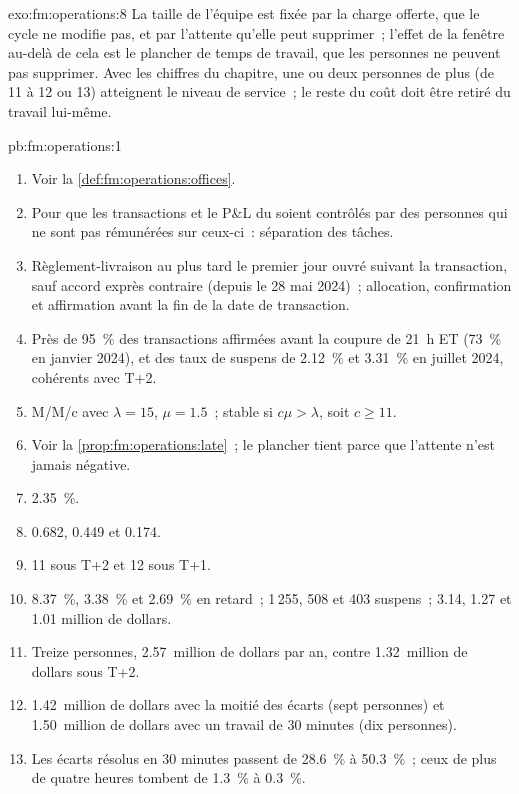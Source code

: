 \begin{solution}{exo:fm:operations:8}
La taille de l'équipe est fixée par la charge offerte, que le cycle ne modifie pas, et par l'attente qu'elle peut supprimer~; l'effet de la fenêtre au-delà de cela est
le plancher de temps de travail, que les personnes ne peuvent pas supprimer. Avec les chiffres du chapitre, une ou deux personnes de plus (de 11 à 12 ou 13) atteignent le niveau de service~; le reste du
coût doit être retiré du travail lui-même.
\end{solution}

\begin{solution}{pb:fm:operations:1}
\begin{enumerate}
\item Voir la \cref{def:fm:operations:offices}.
\item Pour que les transactions et le P\&L du  soient contrôlés par des personnes qui ne sont pas rémunérées sur ceux-ci~: séparation des tâches.
\item Règlement-livraison au plus tard le premier jour ouvré suivant la transaction, sauf accord exprès contraire (depuis le 28 mai 2024)~; allocation,
confirmation et affirmation avant la fin de la date de transaction.
\item Près de 95~\% des transactions affirmées avant la coupure de 21~h ET (73~\% en janvier 2024), et des taux de suspens de 2.12~\% et 3.31~\% en juillet 2024,
cohérents avec T+2.
\item M/M/c avec $\lambda=15$, $\mu=1.5$~; stable si $c\mu>\lambda$, soit $c\ge11$.
\item Voir la \cref{prop:fm:operations:late}~; le plancher tient parce que l'attente n'est jamais négative.
\item 2.35~\%.
\item 0.682, 0.449 et 0.174.
\item 11 sous T+2 et 12 sous T+1.
\item 8.37~\%, 3.38~\% et 2.69~\% en retard~; 1\,255, 508 et 403 suspens~; 3.14, 1.27 et 1.01 million de dollars.
\item Treize personnes, 2.57~million de dollars par an, contre 1.32~million de dollars sous T+2.
\item 1.42~million de dollars avec la moitié des écarts (sept personnes) et 1.50~million de dollars avec un travail de 30 minutes (dix personnes).
\item Les écarts résolus en 30 minutes passent de 28.6~\% à 50.3~\%~; ceux de plus de quatre heures tombent de 1.3~\% à 0.3~\%.

\end{enumerate}
\end{solution}
